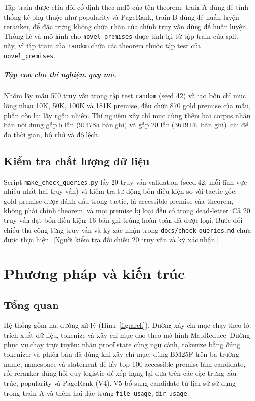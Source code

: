 \documentclass[11pt,a4paper,oneside]{report}
\newcommand{\code}[1]{\texttt{#1}}
\newcommand{\canchot}[1]{\textcolor{red!70!black}{[#1]}}
\begin{document}
Tập train được chia đôi cố định theo md5 của tên theorem: train A dùng để tính thống kê phụ thuộc như popularity và
PageRank, train B dùng để huấn luyện reranker, để đặc trưng không chứa nhãn của chính truy vấn dùng để huấn luyện. Thống kê và mô
hình cho \code{novel\_premises} được tính lại từ tập train của split này, vì tập train của \code{random} chứa các
theorem thuộc tập test của \code{novel\_premises}.

\paragraph{Tập con cho thí nghiệm quy mô.} Nhóm lấy mẫu 500 truy vấn trong tập test \code{random} (seed 42) và tạo bốn chỉ mục
lồng nhau 10K, 50K, 100K và 181K premise, đều chứa 870 gold premise của mẫu, phần còn lại lấy ngẫu nhiên. Thí nghiệm xây
chỉ mục dùng thêm hai corpus nhân bản nội dung gấp 5 lần (\num{904785} bản ghi) và gấp 20 lần (\num{3619140} bản ghi), chỉ
để đo thời gian, bộ nhớ và độ lệch.

\section{Kiểm tra chất lượng dữ liệu}\label{sec:checkdata}

Script \code{make\_check\_queries.py} lấy 20 truy vấn validation (seed 42, mỗi lĩnh vực nhiều nhất hai truy vấn) và kiểm
tra tự động bốn điều kiện so với tactic gốc: gold premise được đánh dấu trong tactic, là accessible premise của theorem, không
phải chính theorem, và mọi premise bị loại đều có trong dead-letter. Cả 20 truy vấn đạt bốn điều kiện; 16 bản ghi trùng hoàn toàn
đã được loại. Bước đối chiếu thủ công từng truy vấn và ký xác nhận trong \code{docs/check\_queries.md} chưa được thực hiện.
\canchot{Người kiểm tra đối chiếu 20 truy vấn và ký xác nhận.}

\chapter{Phương pháp và kiến trúc}\label{sec:method}

\section{Tổng quan}

Hệ thống gồm hai đường xử lý (Hình~\ref{fig:arch}). Đường xây chỉ mục chạy theo lô: trích xuất dữ liệu, tokenize và
xây chỉ mục đảo theo mô hình MapReduce. Đường phục vụ chạy trực tuyến: nhận proof state cùng ngữ cảnh, tokenize bằng đúng
tokenizer và phiên bản đã dùng khi xây chỉ mục, dùng BM25F trên ba trường name, namespace và statement để lấy top 100
accessible premise làm candidate, rồi reranker dùng hồi quy logistic để xếp hạng lại dựa trên các đặc trưng cấu trúc,
popularity và PageRank (V4). V5 bổ sung candidate từ lịch sử sử dụng trong train A và thêm hai đặc trưng
\code{file\_usage}, \code{dir\_usage}.
\end{document}
